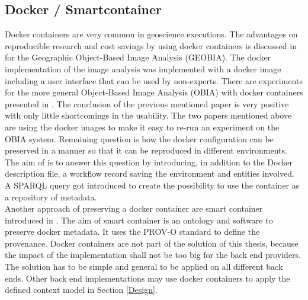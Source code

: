 \documentclass[draft,final]{vutinfth} %
\begin{document}
\subsection{Docker / Smartcontainer}\label{Smartcontainer}
Docker containers are very common in geoscience executions. The advantages on reproducible research and cost savings by using docker containers is discussed in \cite{rs9030290} for the Geographic Object-Based Image Analysis (GEOBIA). The docker implementation of the image analysis was implemented with a docker image including a user interface that can be used by non-experts. There are experiments for the more general Object-Based Image Analysis (OBIA) with docker containers presented in \cite{proceedings456}. The conclusion of the previous mentioned paper is very positive with only little shortcomings in the usability. The two papers mentioned above are using the docker images to make it easy to re-run an experiment on the OBIA system. Remaining question is how the docker configuration can be preserved in a manner so that it can be reproduced in different environments. The aim of \cite{emsley2017a} is to answer this question by introducing, in addition to the Docker description file, a workflow record saving the environment and entities involved. A SPARQL query got introduced to create the possibility to use the container as a repository of metadata.\\ 
Another approach of preserving a docker container are smart container introduced in \cite{Huo2015SmartCA}. The aim of smart container is an ontology and software to preserve docker metadata. It uses the PROV-O standard to define the provenance. 
Docker containers are not part of the solution of this thesis, because the impact of the implementation shall not be too big for the back end providers. The solution has to be simple and general to be applied on all different back ends. Other back end implementations may use docker containers to apply the defined context model in Section \ref{Design}.
\end{document}

